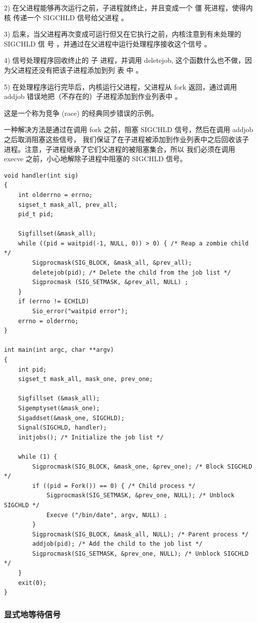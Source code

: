 2) 在父进程能够再次运行之前，子进程就终止，并且变成一个 僵 死进程，使得内核
传递一个 SIGCHLD 信号给父进程 。

3) 后来，当父进程再次变成可运行但又在它执行之前，内核注意到有未处理的
SIGCHLD 信 号 ，并通过在父进程中运行处理程序接收这个信号 。

4) 信号处理程序回收终止的 子 进程，并调用 deletejob, 这个函数什么也不做，因
为父进程还没有把该子进程添加到列 表 中 。

5) 在处理程序运行完毕后，内核运行父进程，父进程从 fork 返回，通过调用 addjob 错误地把（不存在的）子进程添加到作业列表中 。

这是一个称为竞争 (race) 的经典同步错误的示例。

一种解决方法是通过在调用 fork 之前，阻塞 SIGCHLD 信号，然后在调用 addjob 之后取消阻塞这些信号，
我们保证了在子进程被添加到作业列表中之后回收该子进程。注意，子进程继承了它们父进程的被阻塞集合，所以
我们必须在调用 execve 之前，小心地解除子进程中阻塞的 SIGCHLD 信号。

\begin{lstlisting}[style=CStyle]
void handler(int sig)
{
    int olderrno = errno;
    sigset_t mask_all, prev_all;
    pid_t pid;

    Sigfillset(&mask_all);
    while ((pid = waitpid(-1, NULL, 0)) > 0) { /* Reap a zombie child */
        Sigprocmask(SIG_BLOCK, &mask_all, &prev_all);
        deletejob(pid); /* Delete the child from the job list */
        Sigprocmask (SIG_SETMASK, &prev_all, NULL) ;
    }
    if (errno != ECHILD)
        Sio_error("waitpid error");
    errno = olderrno;
}
 
int main(int argc, char **argv)
{
    int pid;
    sigset_t mask_all, mask_one, prev_one;

    Sigfillset (&mask_all);
    Sigemptyset(&mask_one);
    Sigaddset(&mask_one, SIGCHLD);
    Signal(SIGCHLD, handler);
    initjobs(); /* Initialize the job list */
    
    while (1) {
        Sigprocmask(SIG_BLOCK, &mask_one, &prev_one); /* Block SIGCHLD */
        if ((pid = Fork()) == 0) { /* Child process */
            Sigprocmask(SIG_SETMASK, &prev_one, NULL); /* Unblock SIGCHLD */
            Execve ("/bin/date", argv, NULL) ;
        }
        Sigprocmask(SIG_BLOCK, &mask_all, NULL); /* Parent process */
        addjob(pid); /* Add the child to the job list */
        Sigprocmask(SIG_SETMASK, &prev_one, NULL); /* Unblock SIGCHLD */
    }
    exit(0);
}
\end{lstlisting}

\subsubsection{显式地等待信号}

